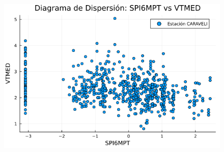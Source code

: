 \begin{figure}[htbp]
\begin{minipage}{0.32\textwidth}
    \includegraphics[width=\linewidth]{Capitulos/Scaterplot/CARAVELI_SPI6MPT_vs_VTMED.png}
\end{minipage}

\vspace{0.5cm}  %


\end{figure}
